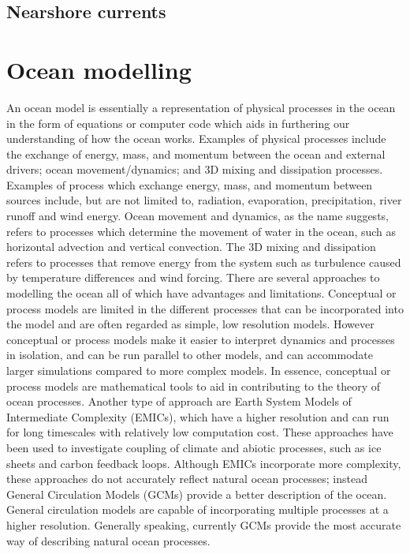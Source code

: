 \documentclass[
]{article}
\begin{document}
\hypertarget{nearshore-currents}{%
\subsection{Nearshore currents}\label{nearshore-currents}}

\hypertarget{ocean-modelling}{%
\section{Ocean modelling}\label{ocean-modelling}}

An ocean model is essentially a representation of physical processes in
the ocean in the form of equations or computer code which aids in
furthering our understanding of how the ocean works. Examples of
physical processes include the exchange of energy, mass, and momentum
between the ocean and external drivers; ocean movement/dynamics; and 3D
mixing and dissipation processes. Examples of process which exchange
energy, mass, and momentum between sources include, but are not limited
to, radiation, evaporation, precipitation, river runoff and wind energy.
Ocean movement and dynamics, as the name suggests, refers to processes
which determine the movement of water in the ocean, such as horizontal
advection and vertical convection. The 3D mixing and dissipation refers
to processes that remove energy from the system such as turbulence
caused by temperature differences and wind forcing. There are several
approaches to modelling the ocean all of which have advantages and
limitations. Conceptual or process models are limited in the different
processes that can be incorporated into the model and are often regarded
as simple, low resolution models. However conceptual or process models
make it easier to interpret dynamics and processes in isolation, and can
be run parallel to other models, and can accommodate larger simulations
compared to more complex models. In essence, conceptual or process
models are mathematical tools to aid in contributing to the theory of
ocean processes. Another type of approach are Earth System Models of
Intermediate Complexity (EMICs), which have a higher resolution and can
run for long timescales with relatively low computation cost. These
approaches have been used to investigate coupling of climate and abiotic
processes, such as ice sheets and carbon feedback loops. Although EMICs
incorporate more complexity, these approaches do not accurately reflect
natural ocean processes; instead General Circulation Models (GCMs)
provide a better description of the ocean. General circulation models
are capable of incorporating multiple processes at a higher resolution.
Generally speaking, currently GCMs provide the most accurate way of
describing natural ocean processes.
\end{document}
